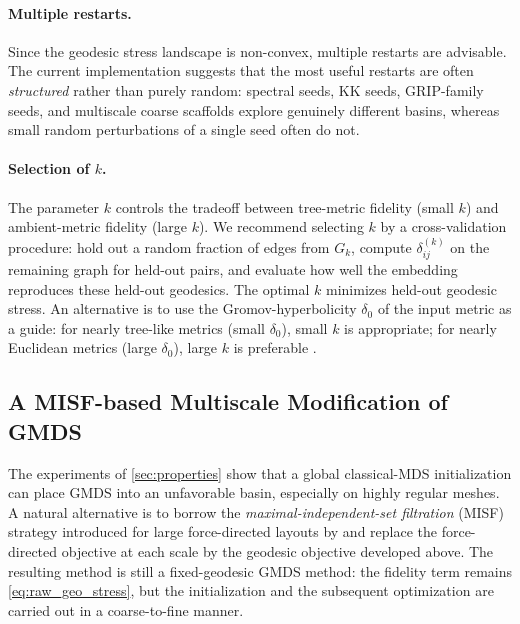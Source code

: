 \documentclass[twoside,11pt]{article}
\newcommand{\Gk}{G_k}
\begin{document}
\paragraph{Multiple restarts.}
Since the geodesic stress landscape is non-convex, multiple restarts are
advisable.  The current implementation suggests that the most useful restarts
are often \emph{structured} rather than purely random: spectral seeds, KK
seeds, GRIP-family seeds, and multiscale coarse scaffolds explore genuinely
different basins, whereas small random perturbations of a single seed often do
not.

\paragraph{Selection of $k$.}
The parameter $k$ controls the tradeoff between tree-metric fidelity
(small $k$) and ambient-metric fidelity (large $k$).  We recommend
selecting $k$ by a cross-validation procedure: hold out a random fraction
of edges from $\Gk$, compute $\delta^{(k)}_{ij}$ on the remaining graph
for held-out pairs, and evaluate how well the embedding reproduces these
held-out geodesics.  The optimal $k$ minimizes held-out geodesic stress.
An alternative is to use the Gromov-hyperbolicity $\delta_0$ of the input
metric as a guide: for nearly tree-like metrics (small $\delta_0$), small
$k$ is appropriate; for nearly Euclidean metrics (large $\delta_0$), large
$k$ is preferable \citep{gromov1987hyperbolic}.

\subsection{A MISF-based Multiscale Modification of GMDS}
\label{sec:misf_gmds}

The experiments of \cref{sec:properties} show that a global classical-MDS
initialization can place GMDS into an unfavorable basin, especially on highly
regular meshes.  A natural alternative is to borrow the
\emph{maximal-independent-set filtration} (MISF) strategy introduced for large
force-directed layouts by \citet{gajer2004multidimensional,gajer2002grip} and
replace the force-directed objective at each scale by the geodesic objective
developed above.  The resulting method is still a fixed-geodesic GMDS method:
the fidelity term remains \cref{eq:raw_geo_stress}, but the initialization and
the subsequent optimization are carried out in a coarse-to-fine manner.
\end{document}
